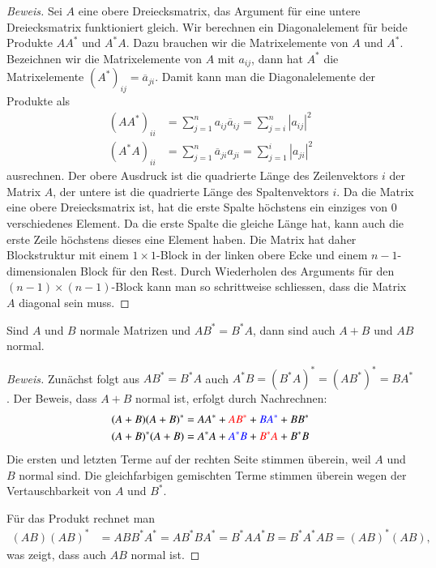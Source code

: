 \begin{proof}[Beweis]
Sei $A$ eine obere Dreiecksmatrix, das Argument für eine untere Dreiecksmatrix
funktioniert gleich.
Wir berechnen ein Diagonalelement für beide Produkte $AA^*$ und $A^*A$.
Dazu brauchen wir die Matrixelemente von $A$ und $A^*$.
Bezeichnen wir die Matrixelemente von $A$ mit $a_{i\!j}$, dann hat $A^*$
die Matrixelemente $(A^*)_{i\!j}=\overline{a}_{ji}$.
Damit kann man die Diagonalelemente der Produkte als
\begin{align*}
(AA^*)_{ii}
&=
\sum_{j=1}^n a_{i\!j}\overline{a}_{i\!j}
=
\sum_{j=i}^n |a_{i\!j}|^2
\\
(A^*A)_{ii}
&=
\sum_{j=1}^n \overline{a}_{ji}a_{ji}
=
\sum_{j=1}^i |a_{ji}|^2
\end{align*}
ausrechnen.
Der obere Ausdruck ist die quadrierte Länge des Zeilenvektors $i$ der Matrix $A$,
der untere ist die quadrierte Länge des Spaltenvektors $i$.
Da die Matrix eine obere Dreiecksmatrix ist, hat die erste Spalte höchstens
ein einziges von $0$ verschiedenes Element.
Da die erste Spalte die gleiche Länge hat,
kann auch die erste Zeile höchstens dieses eine Element haben.
Die Matrix hat daher Blockstruktur mit einem $1\times 1$-Block in der
linken obere Ecke und einem  $n-1$-dimensionalen Block für den Rest.
Durch Wiederholen des Arguments für den $(n-1)\times (n-1)$-Block 
kann man so schrittweise schliessen, dass die Matrix $A$ diagonal sein muss.
\end{proof}


\begin{satz}
Sind $A$ und $B$ normale Matrizen und $AB^*=B^*A$, dann sind auch $A+B$
und $AB$ normal.
\end{satz}

\begin{proof}[Beweis]
Zunächst folgt aus $AB^*=B^*A$ auch
$A^*B = (B^*A)^* = (AB^*)^* = BA^*$.
Der Beweis, dass $A+B$ normal ist, erfolgt durch Nachrechnen:
\begin{align*}
(A+B)(A+B)^*
&=
AA^* + {\color{red}AB^*} + {\color{blue}BA^*}+BB^*
\\
(A+B)^*(A+B)
&=
A^*A + {\color{blue}A^*B} + {\color{red}B^*A} + B^*B
\end{align*}
Die ersten und letzten Terme auf der rechten Seite stimmen überein, weil
$A$ und $B$ normal sind.
Die gleichfarbigen gemischten Terme stimmen überein wegen der
Vertauschbarkeit von $A$ und $B^*$.

Für das Produkt rechnet man
\begin{align*}
(AB)(AB)^*
&= ABB^*A^* = AB^*BA^*
= B^*AA^*B
=
B^*A^*AB
=
(AB)^*(AB),
\end{align*}
was zeigt, dass auch $AB$ normal ist.
\end{proof}

